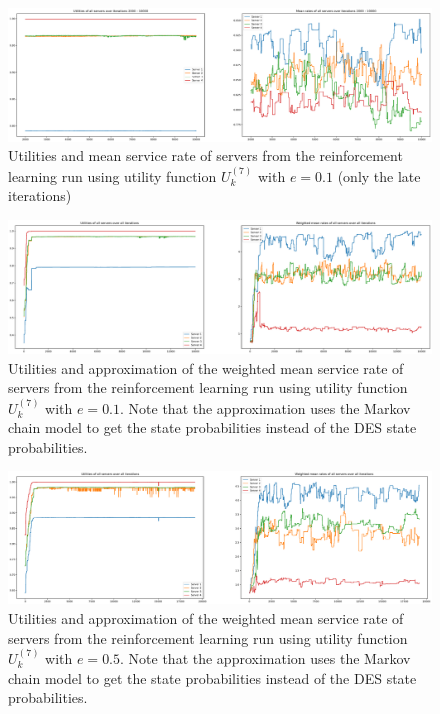 \begin{figure}[H]
    \includegraphics[width=\textwidth]{chapters/00_appendix/03_more_rl_results/Bin/utility_7_eps/u7_2_e01_late_iter.eps}
    \caption{Utilities and mean service rate of servers from the reinforcement
    learning run using utility function \(U_k^{(7)}\) with \(e = 0.1\) (only
    the late iterations)}
    \label{fig:RL_utility7_2_e01_late_iter}
\end{figure}


\begin{figure}[H]
    \includegraphics[width=\textwidth]{chapters/00_appendix/03_more_rl_results/Bin/utility_7_eps/u7_3_e01_markov.eps}
    \caption{Utilities and approximation of the weighted mean service rate of
    servers from the reinforcement learning run using utility function
    \(U_k^{(7)}\) with \(e = 0.1\). Note that the approximation uses the Markov
    chain model to get the state probabilities instead of the DES state
    probabilities.}
    \label{fig:RL_utility7_3_e01_markov}
\end{figure}


\begin{figure}[H]
    \includegraphics[width=\textwidth]{chapters/00_appendix/03_more_rl_results/Bin/utility_7_eps/u7_3_e05_markov.eps}
    \caption{Utilities and approximation of the weighted mean service rate of
    servers from the reinforcement learning run using utility function
    \(U_k^{(7)}\) with \(e = 0.5\). Note that the approximation uses the Markov
    chain model to get the state probabilities instead of the DES state
    probabilities.}
    \label{fig:RL_utility7_3_e05_markov}
\end{figure}


